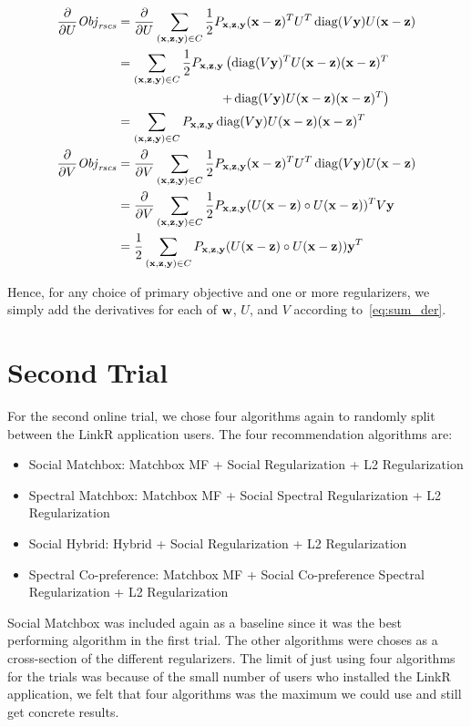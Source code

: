 \begin{itemize}
\begin{align*}
\frac{\partial}{\partial U} \mathit{Obj}_{\mathit{rscs}} & = \frac{\partial}{\partial U} \sum_{(\mathbf{x},\mathbf{z},\mathbf{y}) \in C} \frac{1}{2} P_{\mathbf{x},\mathbf{z},\mathbf{y}} (\mathbf{x} - \mathbf{z})^T U^T \operatorname{diag}(V\mathbf{y}) U (\mathbf{x} - \mathbf{z})\\
& = \sum_{(\mathbf{x},\mathbf{z},\mathbf{y}) \in C} \frac{1}{2} P_{\mathbf{x},\mathbf{z},\mathbf{y}} \left( \operatorname{diag}(V\mathbf{y})^T U (\mathbf{x} - \mathbf{z}) (\mathbf{x} - \mathbf{z})^T \right.\\
& \left. \qquad \qquad \qquad \qquad + \operatorname{diag}(V\mathbf{y}) U (\mathbf{x} - \mathbf{z}) (\mathbf{x} - \mathbf{z})^T \right)\\
& = \sum_{(\mathbf{x},\mathbf{z},\mathbf{y}) \in C} P_{\mathbf{x},\mathbf{z},\mathbf{y}} \operatorname{diag}(V\mathbf{y}) U (\mathbf{x} - \mathbf{z}) (\mathbf{x} - \mathbf{z})^T\\
\frac{\partial}{\partial V} \mathit{Obj}_{\mathit{rscs}} & = \frac{\partial}{\partial V} \sum_{(\mathbf{x},\mathbf{z},\mathbf{y}) \in C} \frac{1}{2} P_{\mathbf{x},\mathbf{z},\mathbf{y}} (\mathbf{x} - \mathbf{z})^T U^T \operatorname{diag}(V\mathbf{y}) U (\mathbf{x} - \mathbf{z})\\
& = \frac{\partial}{\partial V} \sum_{(\mathbf{x},\mathbf{z},\mathbf{y}) \in C} \frac{1}{2} P_{\mathbf{x},\mathbf{z},\mathbf{y}} (U(\mathbf{x}-\mathbf{z}) \circ U(\mathbf{x}-\mathbf{z}))^T V\mathbf{y}\\
& = \frac{1}{2} \sum_{(\mathbf{x},\mathbf{z},\mathbf{y}) \in C} P_{\mathbf{x},\mathbf{z},\mathbf{y}} (U(\mathbf{x}-\mathbf{z}) \circ U(\mathbf{x}-\mathbf{z})) \mathbf{y}^T
\end{align*}
\end{itemize}

Hence, for any choice of primary objective and one or more regularizers,
we simply add the derivatives for each of $\mathbf{w}$, $U$, and $V$
according to~\eqref{eq:sum_der}.

\section{Second Trial}

For the second online trial, we chose four algorithms again to randomly split between the LinkR application users. The four recommendation algorithms are:

\begin{itemize}
\item{Social Matchbox: Matchbox MF + Social Regularization +  L2 Regularization}
\item{Spectral Matchbox: Matchbox MF + Social Spectral Regularization + L2 Regularization}
\item{Social Hybrid: Hybrid + Social Regularization + L2 Regularization}
\item{Spectral Co-preference: Matchbox MF + Social Co-preference Spectral Regularization + L2 Regularization}
\end{itemize}

Social Matchbox was included again as a baseline since it was the best performing algorithm in the first trial. The other algorithms were choses as a cross-section of the different regularizers. The limit of just using four algorithms for the trials was because of the small number of users who installed the LinkR application, we felt that four algorithms was the maximum we could use and still get concrete results.

